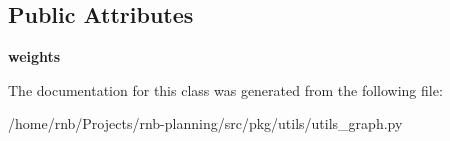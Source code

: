 \subsection*{Public Attributes}
\begin{DoxyCompactItemize}
\item 
\mbox{\label{classrnb-planning_1_1src_1_1pkg_1_1utils_1_1utils__graph_1_1_grid_with_weights_a798d5b841f4d77aa436b35dba214b2d3}} 
{\bfseries weights}
\end{DoxyCompactItemize}


The documentation for this class was generated from the following file\+:\begin{DoxyCompactItemize}
\item 
/home/rnb/\+Projects/rnb-\/planning/src/pkg/utils/utils\+\_\+graph.\+py\end{DoxyCompactItemize}
